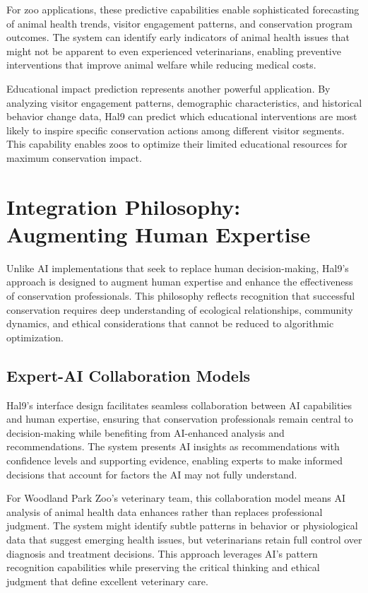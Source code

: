 \documentclass[
  Letterpaper,
]{scrbook}
\begin{document}
For zoo applications, these predictive capabilities enable sophisticated
forecasting of animal health trends, visitor engagement patterns, and
conservation program outcomes. The system can identify early indicators
of animal health issues that might not be apparent to even experienced
veterinarians, enabling preventive interventions that improve animal
welfare while reducing medical costs.

Educational impact prediction represents another powerful application.
By analyzing visitor engagement patterns, demographic characteristics,
and historical behavior change data, Hal9 can predict which educational
interventions are most likely to inspire specific conservation actions
among different visitor segments. This capability enables zoos to
optimize their limited educational resources for maximum conservation
impact.

\section{Integration Philosophy: Augmenting Human
Expertise}\label{integration-philosophy-augmenting-human-expertise}

Unlike AI implementations that seek to replace human decision-making,
Hal9's approach is designed to augment human expertise and enhance the
effectiveness of conservation professionals. This philosophy reflects
recognition that successful conservation requires deep understanding of
ecological relationships, community dynamics, and ethical considerations
that cannot be reduced to algorithmic optimization.

\subsection{Expert-AI Collaboration
Models}\label{expert-ai-collaboration-models}

Hal9's interface design facilitates seamless collaboration between AI
capabilities and human expertise, ensuring that conservation
professionals remain central to decision-making while benefiting from
AI-enhanced analysis and recommendations. The system presents AI
insights as recommendations with confidence levels and supporting
evidence, enabling experts to make informed decisions that account for
factors the AI may not fully understand.

For Woodland Park Zoo's veterinary team, this collaboration model means
AI analysis of animal health data enhances rather than replaces
professional judgment. The system might identify subtle patterns in
behavior or physiological data that suggest emerging health issues, but
veterinarians retain full control over diagnosis and treatment
decisions. This approach leverages AI's pattern recognition capabilities
while preserving the critical thinking and ethical judgment that define
excellent veterinary care.
\end{document}
